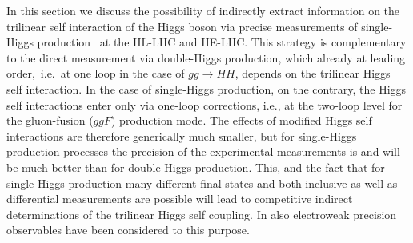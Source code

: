 \documentclass[../report.tex]{subfiles}
\providecommand{\main}{..}
\begin{document}


\label{sec:HH_HE_atlas}




\label{sec:HH_indirect}

In this section we discuss the possibility of indirectly extract information on the trilinear self interaction of the Higgs boson via precise measurements of single-Higgs production~\cite{McCullough:2013rea,Gorbahn:2016uoy,Degrassi:2016wml,Bizon:2016wgr,DiVita:2017eyz,Barklow:2017awn,Maltoni:2017ims,DiVita:2017vrr,Maltoni:2018ttu} at the HL-LHC and HE-LHC. This strategy is complementary to the direct measurement via double-Higgs production, which already at leading order,~i.e.~at one loop in the case of $gg \to HH$, depends on the trilinear Higgs self interaction. In the case of single-Higgs production, on the contrary, the Higgs self interactions enter only via one-loop corrections, i.e., at the two-loop level for the gluon-fusion ($ggF$) production mode. The effects of modified Higgs self interactions are therefore generically much smaller, but for single-Higgs production processes the precision of the experimental measurements is and will be much better than for double-Higgs production. This, and the fact that for single-Higgs production many different final states and both inclusive as well as  differential measurements are possible will lead to competitive indirect determinations of the trilinear Higgs self coupling. In \cite{Degrassi:2017ucl,Kribs:2017znd} also electroweak precision observables have been considered to this purpose.



\label{sec:CMS_HH_indirect}




\label{sec:HH_Global_fit}

\end{document}
